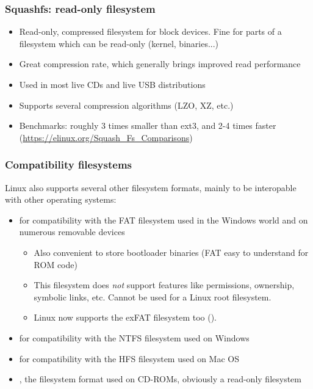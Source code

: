 \begin{frame}
  \frametitle{Squashfs: read-only filesystem}
  \begin{itemize}
  \item Read-only, compressed filesystem for block devices. Fine for
    parts of a filesystem which can be read-only (kernel, binaries...)
  \item Great compression rate, which generally brings improved read
    performance
  \item Used in most live CDs and live USB distributions
  \item Supports several compression algorithms (LZO, XZ, etc.)
  \item Benchmarks: roughly 3 times smaller than ext3, and 2-4 times
    faster (\url{https://elinux.org/Squash_Fs_Comparisons})
  \end{itemize}
\end{frame}

\begin{frame}
  \frametitle{Compatibility filesystems}
  Linux also supports several other filesystem formats, mainly to be
  interopable with other operating systems:
  \begin{itemize}
  \item {} for compatibility with the FAT filesystem used in
    the Windows world and on numerous removable devices
    \begin{itemize}
    \item Also convenient to store bootloader binaries (FAT easy
      to understand for ROM code)
    \item This filesystem does {\em not} support features like
      permissions, ownership, symbolic links, etc. Cannot be used for
      a Linux root filesystem.
    \item Linux now supports the exFAT filesystem too ().
    \end{itemize}
  \item {} for compatibility with the NTFS filesystem used on
    Windows
  \item {} for compatibility with the HFS filesystem used on
    Mac OS
  \item {}, the filesystem format used on CD-ROMs,
    obviously a read-only filesystem
  \end{itemize}
\end{frame}

